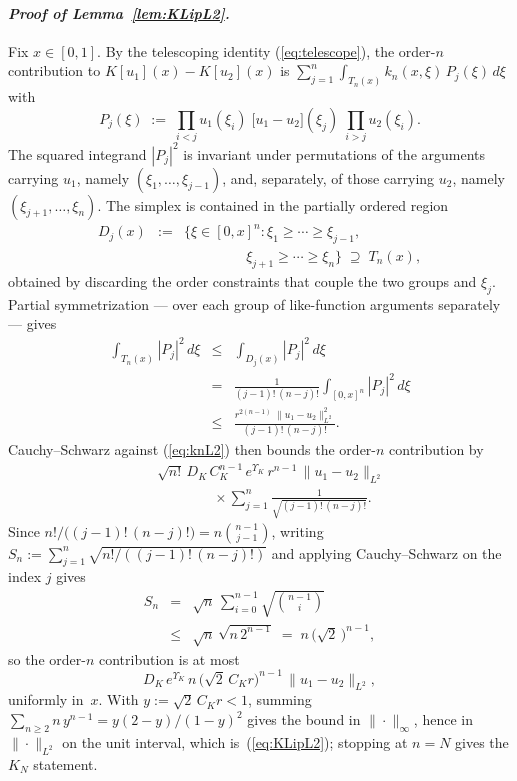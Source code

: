 \documentclass[amsthm]{autart}
\theoremstyle{plain}
\theoremstyle{definition}
\newcommand{\Ltwo}{L^2}
\begin{document}
\paragraph*{\normalfont\em Proof of Lemma~\ref{lem:KLipL2}.}
Fix $x \in [0,1]$. By the telescoping identity (\ref{eq:telescope}), the order-$n$ contribution to $K[u_1](x) - K[u_2](x)$ is $\sum_{j=1}^n \int_{T_n(x)} k_n(x,\xi)\, P_j(\xi)\, d\xi$ with
\begin{equation}
P_j(\xi) \;:=\; \prod_{i<j} u_1(\xi_i)\;\bigl[u_1 - u_2\bigr](\xi_j)\;\prod_{i>j} u_2(\xi_i).
\label{eq:Pjdef}
\end{equation}
The squared integrand $|P_j|^2$ is invariant under permutations of the arguments carrying $u_1$, namely $(\xi_1,\ldots,\xi_{j-1})$, and, separately, of those carrying $u_2$, namely $(\xi_{j+1},\ldots,\xi_n)$. The simplex is contained in the partially ordered region
\begin{eqnarray}
D_j(x) &:=& \bigl\{\xi \in [0,x]^n : \xi_1 \ge \cdots \ge \xi_{j-1}, \nonumber \\
&& \qquad\qquad\ \ \xi_{j+1} \ge \cdots \ge \xi_n\bigr\} \;\supseteq\; T_n(x),
\label{eq:Djdef}
\end{eqnarray}
obtained by discarding the order constraints that couple the two groups and $\xi_j$. Partial symmetrization --- over each group of like-function arguments separately --- gives
\begin{eqnarray}
\int_{T_n(x)} |P_j|^2\, d\xi &\le& \int_{D_j(x)} |P_j|^2\, d\xi \nonumber \\
&=& \frac{1}{(j-1)!\,(n-j)!} \int_{[0,x]^n} |P_j|^2\, d\xi \nonumber \\
&\le& \frac{r^{2(n-1)}\;\|u_1 - u_2\|_{\Ltwo}^2}{(j-1)!\,(n-j)!}.
\label{eq:block_bound}
\end{eqnarray}
Cauchy--Schwarz against (\ref{eq:knL2}) then bounds the order-$n$ contribution by
\begin{eqnarray}
&& \sqrt{n!}\, D_K\, C_K^{n-1}\, e^{\Upsilon_K}\, r^{n-1}\, \|u_1 - u_2\|_{\Ltwo} \nonumber \\
&& \qquad\qquad \times \sum_{j=1}^n \frac{1}{\sqrt{(j-1)!\,(n-j)!}}.
\label{eq:ordern_raw}
\end{eqnarray}
Since $n!/\bigl((j-1)!\,(n-j)!\bigr) = n \binom{n-1}{j-1}$, writing $S_n := \sum_{j=1}^n \sqrt{n!/((j-1)!\,(n-j)!)}$ and applying Cauchy--Schwarz on the index $j$ gives
\begin{eqnarray}
S_n &=& \sqrt{n}\, \sum_{i=0}^{n-1} \sqrt{\binom{n-1}{i}} \nonumber \\
&\le& \sqrt{n}\,\sqrt{n\, 2^{n-1}} \;=\; n\,\bigl(\sqrt{2}\,\bigr)^{n-1},
\label{eq:comb_bound}
\end{eqnarray}
so the order-$n$ contribution is at most
\begin{equation}
D_K\, e^{\Upsilon_K}\, n\, \bigl(\sqrt{2}\,C_K r\bigr)^{n-1}\, \|u_1 - u_2\|_{\Ltwo},
\label{eq:ordern_final}
\end{equation}
uniformly in~$x$. With $y := \sqrt{2}\,C_K r < 1$, summing $\sum_{n \ge 2} n\, y^{n-1} = y(2-y)/(1-y)^2$ gives the bound in $\|\cdot\|_\infty$, hence in $\|\cdot\|_{\Ltwo}$ on the unit interval, which is~(\ref{eq:KLipL2}); stopping at $n = N$ gives the $K_N$ statement.
\end{document}

